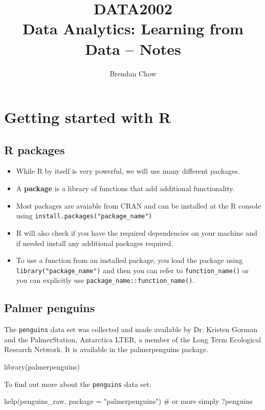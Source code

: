 \documentclass[a4paper]{article}
\begin{document}
	\title{{DATA2002}\\{\normalsize{Data Analytics: Learning from Data -- Notes}}}
	\author{Brendan Chow}
	\maketitle
	\newpage
	\pagestyle{fancynotes}
\section{Getting started with R}\label{sec:1}
\subsection{R packages}
\begin{itemize}
	\item While R by itself is very powerful, we will use many different packages.
	\item A \textbf{package} is a library of functions that add additional functionality.
	\item Most packages are avaiable from CRAN and can be installed at the R console using \lstinline|install.packages("package_name")|
	\item R will also check if you have the required dependencies on your machine and if needed install any additional packages required.
	\item To use a function from an installed package, you load the package using \lstinline|library("package_name")| and then you can refer to \lstinline|function_name()| or you can explicitly use \lstinline|package_name::function_name()|.
\end{itemize}
\subsection{Palmer penguins}
The \lstinline|penguins| data set was collected and made available by Dr. Kristen Gorman and the PalmerStation, Antarctica LTER, a member of the Long Term Ecological Research Network.
It is available in the palmerpenguins package.
\begin{Schunk}
\begin{Sinput}
library(palmerpenguins)
\end{Sinput}
\end{Schunk}
To find out more about the \lstinline|penguins| data set:
\begin{Schunk}
\begin{Sinput}
help(penguins_raw, package = "palmerpenguins")
# or more simply
?penguins
\end{Sinput}
\end{Schunk}
\end{document}
